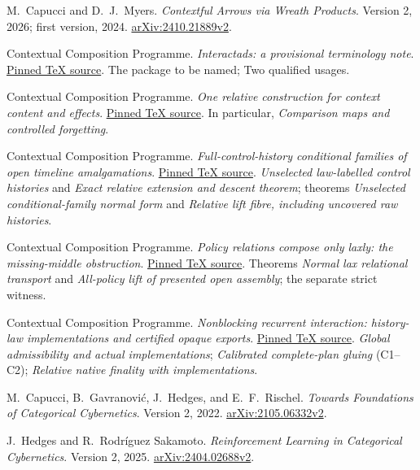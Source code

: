 \documentclass[11pt]{article}
\theoremstyle{definition}
\newcommand{\reporev}{777a28abb23ba9ccf9a98d0d14e0fb845907c5a8}
\newcommand{\reposrc}[2]{\href{https://github.com/eternal-november/eos-research-programmes/blob/\reporev/projects/contextual-composition/#1}{#2}}
\begin{document}
\begin{thebibliography}{9}
M.~Capucci and D.~J.~Myers.
\emph{Contextful Arrows via Wreath Products}.
Version 2, 2026; first version, 2024.
\href{https://arxiv.org/abs/2410.21889v2}{arXiv:2410.21889v2}.

Contextual Composition Programme.
\emph{Interactads: a provisional terminology note}.
\reposrc{foundations/terminology/Interactad_Terminology_Note.tex}{Pinned TeX source}.
The package to be named; Two qualified usages.

Contextual Composition Programme.
\emph{One relative construction for context content and effects}.
\reposrc{foundations/relative-construction/delivery/One_relative_construction_for_context_content_and_effects.tex}{Pinned TeX source}.
In particular, \emph{Comparison maps and controlled forgetting}.

Contextual Composition Programme.
\emph{Full-control-history conditional families of open timeline amalgamations}.
\reposrc{foundations/native-whole-scope-feedback/Conditional_Open_Timeline_Families.tex}{Pinned TeX source}.
\emph{Unselected law-labelled control histories} and
\emph{Exact relative extension and descent theorem}; theorems
\emph{Unselected conditional-family normal form} and
\emph{Relative lift fibre, including uncovered raw histories}.

Contextual Composition Programme.
\emph{Policy relations compose only laxly: the missing-middle obstruction}.
\reposrc{foundations/native-whole-scope-feedback/Policy_Relational_Transport.tex}{Pinned TeX source}.
Theorems \emph{Normal lax relational transport} and
\emph{All-policy lift of presented open assembly}; the separate strict witness.

Contextual Composition Programme.
\emph{Nonblocking recurrent interaction: history-law implementations and certified opaque exports}.
\reposrc{foundations/native-whole-scope-feedback/Nonblocking_History_Controllers_and_Certified_Exports.tex}{Pinned TeX source}.
\emph{Global admissibility and actual implementations};
\emph{Calibrated complete-plan gluing} (C1--C2);
\emph{Relative native finality with implementations}.

M.~Capucci, B.~Gavranovi\'c, J.~Hedges, and E.~F.~Rischel.
\emph{Towards Foundations of Categorical Cybernetics}.
Version 2, 2022.
\href{https://arxiv.org/abs/2105.06332v2}{arXiv:2105.06332v2}.

J.~Hedges and R.~Rodr\'iguez Sakamoto.
\emph{Reinforcement Learning in Categorical Cybernetics}.
Version 2, 2025.
\href{https://arxiv.org/abs/2404.02688v2}{arXiv:2404.02688v2}.
\end{thebibliography}
\end{document}

